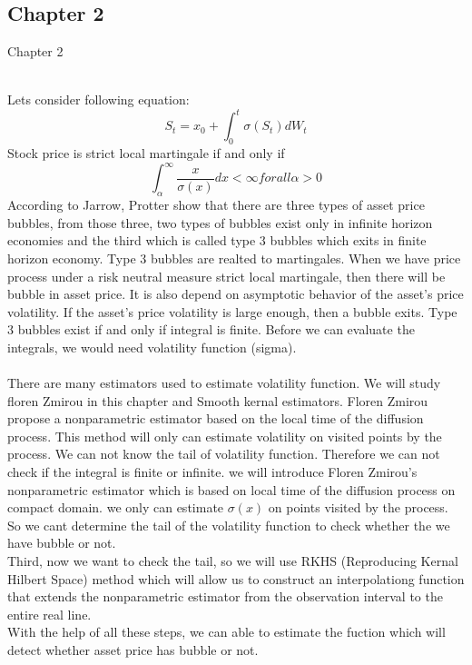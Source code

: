 
\subsection{Chapter 2}
 Chapter 2\\\
 
 Lets consider following equation:
 \begin{equation}
S_t = x_0 + \int_0^t \sigma\left(S_t\right)dW_t
\end{equation}
 Stock price is strict local martingale if and only if \\
\begin{equation}
\int_\alpha^\infty \frac{x}{\sigma\left(x\right)}dx < \infty  for all \alpha >0
\end{equation} 
According to Jarrow, Protter show that there are three types of asset price bubbles, from those three, two types of bubbles exist only in infinite horizon economies and the third which is called type 3 bubbles which exits in finite horizon economy. Type 3 bubbles are realted to martingales. When we have price process under a risk neutral measure strict local martingale, then there will be bubble in asset price. It is also depend on asymptotic behavior of the asset's price volatility. If the asset's price volatility is large enough, then a bubble exits. Type 3 bubbles exist if and only if integral is finite. Before we can evaluate the integrals, we would need volatility function (sigma). \\\\
There are many estimators used to estimate volatility function. We will study floren Zmirou in this chapter and Smooth kernal estimators. Floren Zmirou propose a nonparametric estimator based on the local time of the diffusion process. This method will only can estimate volatility on visited points by the process. We can not know the tail of volatility function. Therefore we can not check if the integral is finite or infinite.  we will introduce Floren Zmirou's nonparametric estimator which is based on local time of the diffusion process on compact domain. 
 we only can estimate $\sigma(x)$ on points visited by the process. 
 So we cant determine the tail of the volatility function to check whether the we have bubble or not. \\
 
 Third, now we want to check the tail, so we will use RKHS (Reproducing Kernal Hilbert Space)  method which will allow us to construct an interpolationg function that extends the nonparametric estimator from the observation interval to the entire real line.\\
 
 With the help of all these steps, we can able to estimate the fuction which will detect whether asset price has bubble or not.\\
 